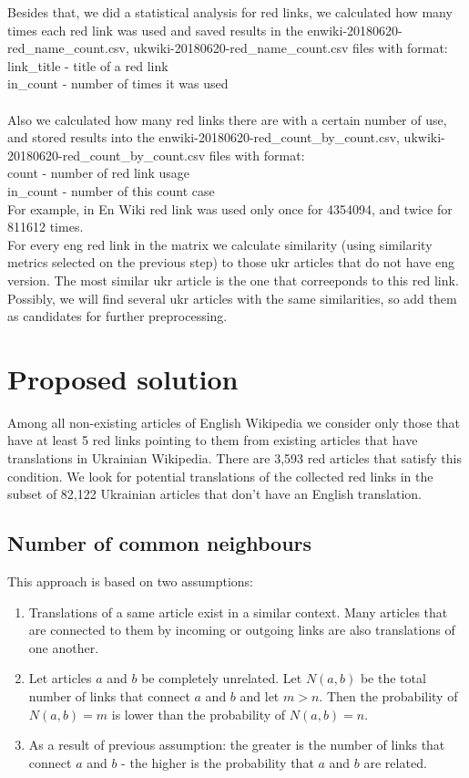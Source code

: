 \documentclass[11pt,a4paper]{article}
\begin{document}
Besides that, we did a statistical analysis for red links, we calculated how many times each red link was used and saved results in the enwiki-20180620-red\_name\_count.csv, ukwiki-20180620-red\_name\_count.csv files with format:\\
link\_title - title of a red link\\
in\_count - number of times it was used\\
\\
Also we calculated how many red links there are with a certain number of use, and stored results into the enwiki-20180620-red\_count\_by\_count.csv, ukwiki-20180620-red\_count\_by\_count.csv files with format:\\
count - number of red link usage\\
in\_count - number of this count case\\

For example, in En Wiki red link was used only once for 4354094, and twice for 811612 times.\\

For every eng red link in the matrix we calculate similarity (using similarity metrics selected on the previous step) to those ukr articles that do not have eng version. The most similar ukr article is the one that correeponds to this red link. Possibly, we will find several ukr articles with the same similarities, so add them as candidates for further preprocessing.

\section{Proposed solution}

Among all non-existing articles of English Wikipedia we consider only those that have at least 5 red links pointing to them from existing articles that have translations in Ukrainian Wikipedia. There are 3,593 red articles that satisfy this condition. We look for potential translations of the collected red links in the subset of 82,122 Ukrainian articles that don't have an English translation.

\subsection{Number of common neighbours}

This approach is based on two assumptions:

\begin{enumerate}
	\item Translations of a same article exist in a similar context. Many articles that are connected to them by incoming or outgoing links are also translations of one another.
	\item Let articles $a$ and $b$ be completely unrelated. Let $N(a, b)$ be the total number of links that connect $a$ and $b$ and let $m > n$. Then the probability of $N(a, b) = m$ is lower than the probability of $N(a, b) = n$.
	\item As a result of previous assumption: the greater is the number of links that connect $a$ and $b$ - the higher is the probability that $a$ and $b$ are related.
\end{enumerate}
\end{document}
